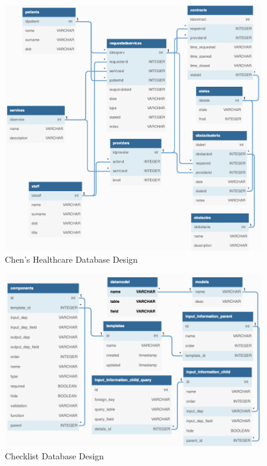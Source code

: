 \begin{figure}[ht]
    \centering
    \includegraphics[width=\textwidth]{overleaf/images/chens_healthcare_db_design.png}
    \caption{Chen's Healthcare Database Design}
    \label{fig:chens_healthcare_db_design}
\end{figure}

\begin{figure}[ht]
    \centering
    \includegraphics[width=\textwidth]{overleaf/images/checklist_db_design.png}
    \caption{Checklist Database Design}
    \label{fig:checklist_db_design}
\end{figure}

